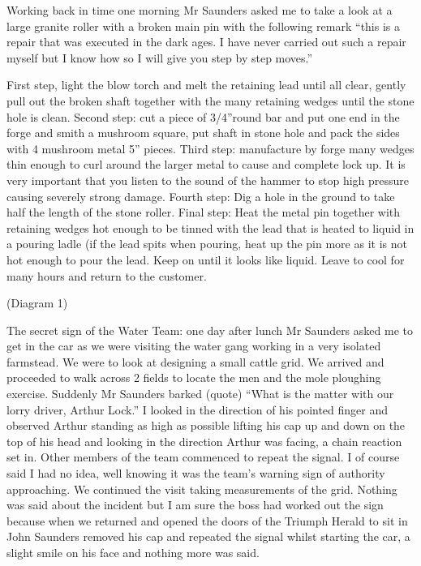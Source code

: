 
Working back in time one morning Mr Saunders asked me to take a look at a large
granite roller with a broken main pin with the following remark ``this is a
repair that was executed in the dark ages.  I have never carried out such a
repair myself but I know how so I will give you step by step moves.''

First step, light the blow torch and melt the retaining lead until all clear,
gently pull out the broken shaft together with the many retaining wedges until
the stone hole is clean.  Second step: cut a piece of 3/4''round bar and put
one end in the forge and smith a mushroom square, put shaft in stone hole and
pack the sides with 4 mushroom metal 5'' pieces.  Third step:  manufacture by
forge many wedges thin enough to curl around the larger metal to cause and
complete lock up.  It is very important that you listen to the sound of the
hammer to stop high pressure causing severely strong damage.  Fourth step:  Dig
a hole in the ground to take half the length of the stone roller.  Final step:
Heat the metal pin together with retaining wedges hot enough to be tinned with
the lead that is heated to liquid in a pouring ladle (if the lead spits when
pouring, heat up the pin more as it is not hot enough to pour the lead.  Keep
on until it looks like liquid.  Leave to cool for many hours and return to the
customer.

(Diagram 1)

The secret sign of the Water Team:  one day after lunch Mr Saunders asked me to
get in the car as we were visiting the water gang working in a very isolated
farmstead.  We were to look at designing a small cattle grid.  We arrived and
proceeded to walk across 2 fields to locate the men and the mole ploughing
exercise.  Suddenly Mr Saunders barked (quote) ``What is the matter with our
lorry driver, Arthur Lock.''  I looked in the direction of his pointed finger
and observed Arthur standing as high as possible lifting his cap up and down on
the top of his head and looking in the direction Arthur was facing, a chain
reaction set in.  Other members of the team commenced to repeat the signal.  I
of course said I had no idea, well knowing it was the team's warning sign of
authority approaching.  We continued the visit taking measurements of the grid.
Nothing was said about the incident but I am sure the boss had worked out the
sign because when we returned and opened the doors of the Triumph Herald to sit
in John Saunders removed his cap and repeated the signal whilst starting the
car, a slight smile on his face and nothing more was said.

